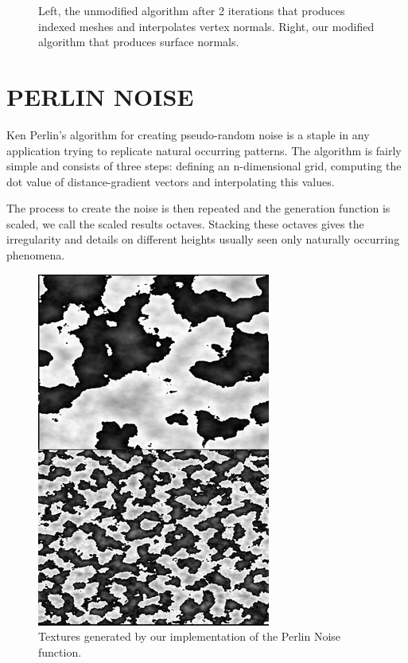 \documentclass[a4paper,twoside]{article}
\begin{document}
\begin{figure}
\caption{Left, the unmodified algorithm after 2 iterations that produces indexed meshes and interpolates vertex normals. Right, our modified algorithm that produces surface normals.}
\label{fig_isn}
\end{figure}

\section{\uppercase{Perlin Noise}}
\label{sec:pnoise}
\noindent Ken Perlin's algorithm for creating pseudo-random noise is a staple in any application trying to replicate natural occurring patterns. The algorithm is fairly simple and consists of three steps: defining an n-dimensional grid, computing the dot value of distance-gradient vectors and interpolating this values.

The process to create the noise is then repeated and the generation function is scaled, we call the scaled results octaves. Stacking these octaves gives the irregularity and details on different heights usually seen only naturally occurring phenomena. 

\begin{figure}
\centering
\includegraphics[scale=0.5]{./images/perlin_noise/combined.png}
\caption{Textures generated by our implementation of the Perlin Noise function.}
\label{fig_pn}
\end{figure}
\end{document}
